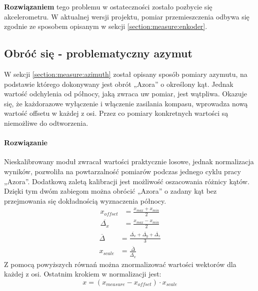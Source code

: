         \textbf{Rozwiązaniem} tego problemu w ostateczności zostało pozbycie się akcelerometru.
        W aktualnej wersji projektu, pomiar przemieszczenia odbywa się zgodnie ze sposobem opisanym w sekcji \ref{section:measure:enkoder}.


    \subsection{Obróć się - problematyczny azymut}
        W sekcji \ref{section:measure:azimuth} został opisany sposób pomiary azymutu, na podstawie którego dokonywany jest obrót „Azora” o określony kąt.
        Jednak wartość odchylenia od północy, jaką zwraca uw pomiar, jest wątpliwa.
        Okazuje się, że każdorazowe wyłączenie i włączenie zasilania kompasu, wprowadza nową wartość offsetu w każdej z osi.
        Przez co pomiary konkretnych wartości są niemożliwe do odtworzenia. 

        \paragraph{Rozwiązanie\\}
        Nieskalibrowany moduł zwracał wartości praktycznie losowe, jednak normalizacja wyników, pozwoliła na powtarzalność pomiarów podczas jednego cyklu pracy „Azora”.
        Dodatkową zaletą kalibracji jest możliwość oszacowania różnicy kątów.
        Dzięki tym dwóm zabiegom można obrócić „Azora” o zadany kąt bez przejmowania się dokładnością wyznaczenia północy.
        \begin{align}
            x_{offset} &= \frac{x_{max} + x_{min}}{2}\\
            \overline{\Delta_x} &=  \frac{x_{max} - x_{min}}{2}
        \end{align}
        \begin{align}
            \overline{\Delta} &= \frac{\overline{\Delta_x} + \overline{\Delta_y} + \overline{\Delta_z}}{3}\\
            x_{scale} &= \frac{\overline{\Delta}}{\overline{\Delta_x}}
        \end{align}
        Z pomocą powyższych równań można znormalizować wartości wektorów dla każdej z osi. Ostatnim krokiem w normalizacji jest:
        \begin{equation}
            x = (x_{measure} - x_{offset}) \cdot x_{scale}
        \end{equation}